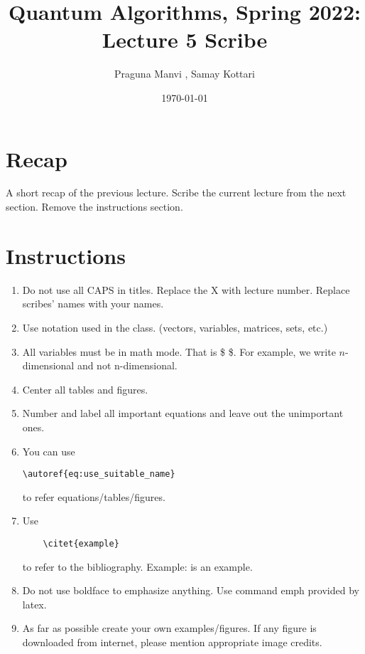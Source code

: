 \documentclass[11.5pt, paper=a4]{article}
\title{Quantum Algorithms, Spring 2022: Lecture 5 Scribe}
\author{Praguna Manvi , Samay Kottari}
\date{\today}
\theoremstyle{definition}
\numberwithin{theorem}{section}
\begin{document}
\maketitle

\section{Recap}

A short recap of the previous lecture. Scribe the current lecture from the next section. Remove the instructions section.

\section{Instructions}

\begin{enumerate}
\item Do not use all CAPS in titles. Replace the X with lecture number. Replace scribes' names with your names.

\item Use notation used in the class. (vectors, variables, matrices, sets, etc.)

\item All variables must be in math mode. That is \$ \$. 
For example, we write  $n$-dimensional and not n-dimensional. 

\item Center all tables and figures. 

\item Number and label all important equations and leave out the unimportant ones. 

\item You can use \begin{verbatim}
\autoref{eq:use_suitable_name}
\end{verbatim} to refer equations/tables/figures.

\item Use \begin{verbatim}
    \citet{example}
\end{verbatim} to refer to the bibliography. Example: \citet{example} is an example.

\item Do not use boldface to emphasize anything. Use command emph provided by latex.

\item As far as possible create your own examples/figures.
If any figure is downloaded from internet, please mention appropriate image credits.


\end{enumerate}
\end{document}
